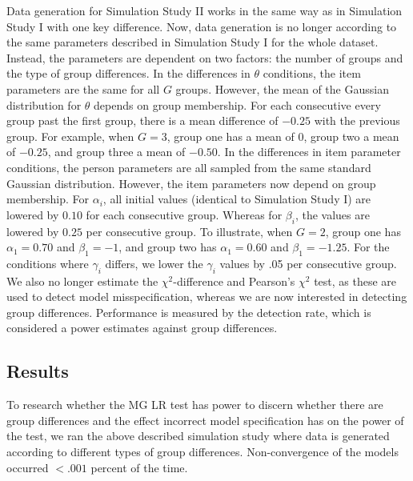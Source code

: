 \documentclass[Royal,sageapa,times,doublespace]{sagej}
\begin{document}
\indent Data generation for Simulation Study II works in the same way as in Simulation Study I with one key difference. Now, data generation is no longer according to the same parameters described in Simulation Study I for the whole dataset. Instead, the parameters are dependent on two factors: the number of groups and the type of group differences. In the differences in $\theta$ conditions, the item parameters are the same for all $G$ groups. However, the mean of the Gaussian distribution for $\theta$ depends on group membership. For each consecutive every group past the first group, there is a mean difference of $-0.25$ with the previous group. For example, when $G = 3$, group one has a mean of 0, group two a mean of $-0.25$, and group three a mean of $-0.50$. In the differences in item parameter conditions, the person parameters are all sampled from the same standard Gaussian distribution. However, the item parameters now depend on group membership. For $\alpha_i$, all initial values (identical to Simulation Study I) are lowered by $0.10$ for each consecutive group. Whereas for $\beta_i$, the values are lowered by $0.25$ per consecutive group. To illustrate, when $G = 2$, group one has $\alpha_1 = 0.70$ and $\beta_1 = -1$, and group two has $\alpha_1 = 0.60$ and $\beta_1 = -1.25$. For the conditions where $\gamma_i$ differs, we lower the $\gamma_i$ values by .05 per consecutive group. We also no longer estimate the $\chi^2$-difference and Pearson's $\chi^2$ test, as these are used to detect model misspecification, whereas we are now interested in detecting group differences. Performance is measured by the detection rate, which is considered a power estimates against group differences.

\subsection{Results}

To research whether the MG LR test has power to discern whether there are group differences and the effect incorrect model specification has on the power of the test, we ran the above described simulation study where data is generated according to different types of group differences. Non-convergence of the models occurred $<.001$ percent of the time.
\end{document}
